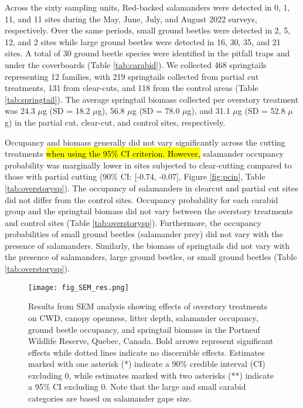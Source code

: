 \vspace{10pt}

Across the sixty sampling units, Red-backed salamanders were detected in 0, 1, 11, and 11 sites during the May, June, July, and August 2022 surveys, respectively. 
Over the same periods, small ground beetles were detected in 2, 5, 12, and 2 sites while large ground beetles were detected in 16, 30, 35, and 21 sites.
A total of 30 ground beetle species were identified in the pitfall traps and under the coverboards (Table \ref{tab:carabid}). 
We collected 468 springtails representing 12 families, with 219 springtails collected from partial cut treatments, 131 from clear-cuts, and 118 from the control areas (Table \ref{tab:springtail}). 
The average springtail biomass collected per overstory treatment was 24.3 $\mu$g (SD = 18.2 $\mu$g), 56.8 $\mu$g (SD = 78.0 $\mu$g), and 31.1 $\mu$g (SD = 52.8 $\mu$g) in the partial cut, clear-cut, and control sites, respectively. 

Occupancy and biomass generally did not vary significantly across the cutting treatments \hl{when using the 95\% CI criterion. 
However,} salamander occupancy probability was marginally lower in sites subjected to clear-cutting compared to those with partial cutting (90\% CI: [-0.74, -0.07], Figure \ref{fig:pcin}, Table \ref{tab:overstorysp}). 
The occupancy of salamanders in clearcut and partial cut sites did not differ from the control sites. 
Occupancy probability for each carabid group and the springtail biomass did not vary between the overstory treatments and control sites (Table \ref{tab:overstorysp}). 
Furthermore, the occupancy probabilities of small ground beetles (salamander prey) did not vary with the presence of salamanders. 
Similarly, the biomass of springtails did not vary with the presence of salamanders, large ground beetles, or small ground beetles (Table \ref{tab:overstorysp}).

\begin{figure}[h!]
	\centering
	\texttt{[image: fig\_SEM\_res.png]}
	\caption[Results from structural equation modeling analysis revealing effects of overstory treatments on coarse woody debris volume,
  canopy openness, litter depth, salamander occupancy, ground beetle occupancy, and springtail biomass.]
  {Results from SEM analysis showing effects of overstory treatments on CWD, 
  canopy openness, litter depth, salamander occupancy, ground beetle occupancy, and springtail biomass in the Portneuf Wildlife Reserve, 
  Quebec, Canada. Bold arrows represent significant effects while dotted lines indicate no discernible effects. 
  Estimates marked with one asterisk (*) indicate a 90\% credible interval (CI) excluding 0, while estimates marked with two asterisks (**) indicate a 95\% CI excluding 0. 
  Note that the large and small carabid categories are based on salamander gape size.}
	\label{fig:SEMres}
\end{figure}  

